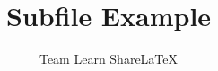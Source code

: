 \documentclass{article}
\title{Subfile Example}
\author{Team Learn ShareLaTeX}
\date{ }
\begin{document}
 
\maketitle
 
 

\break 
 

 
\end{document}
